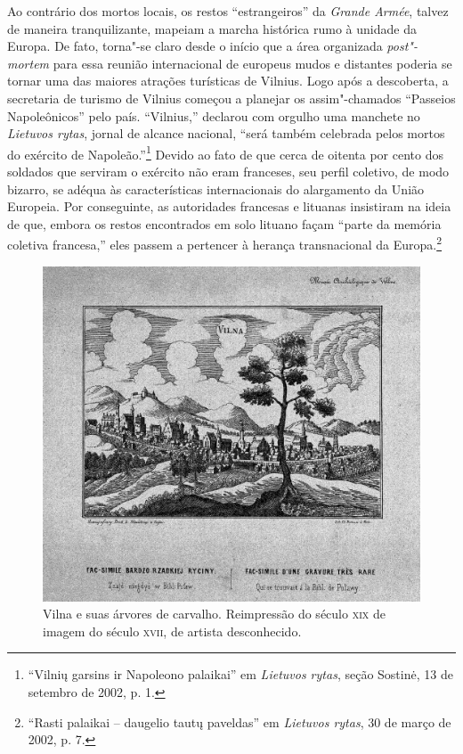 Ao contrário dos mortos locais, os restos ``estrangeiros'' da
\textit{Grande Armée}, talvez de maneira tranquilizante, mapeiam a marcha
histórica rumo à unidade da Europa. De fato, torna"-se claro desde o
início que a área organizada \textit{post"-mortem} para essa reunião
internacional de europeus mudos e distantes poderia se tornar uma das
maiores atrações turísticas de Vilnius. Logo após a descoberta, a
secretaria de turismo de Vilnius começou a planejar os assim"-chamados
``Passeios Napoleônicos'' pelo país. ``Vilnius,'' declarou com orgulho
uma manchete no \textit{Lietuvos rytas}, jornal de alcance nacional,
``será também celebrada pelos mortos do exército de
Napoleão.''\footnote{``Vilnių garsins ir Napoleono palaikai'' em \textit{Lietuvos rytas}, seção Sostinė, 13 de setembro de 2002, p. 1.} Devido ao fato de que cerca de oitenta por cento dos soldados que
serviram o exército não eram franceses, seu perfil coletivo, de modo
bizarro, se adéqua às características internacionais do alargamento da
União Europeia. Por conseguinte, as autoridades francesas e lituanas
insistiram na ideia de que, embora os restos encontrados em solo lituano
façam ``parte da memória coletiva francesa,'' eles passem a pertencer à
herança transnacional da Europa.\footnote{``Rasti palaikai -- daugelio tautų paveldas'' em \textit{Lietuvos rytas}, 30 de março de 2002, p. 7.}


\begin{figure}[!h]
    \centering
    \includegraphics[width=\textwidth]{ilustra-11.png}
    \caption{Vilna e suas árvores de carvalho. Reimpressão do século \textsc {xix} de imagem do século \textsc {xvii}, de artista desconhecido.}
\end{figure}

